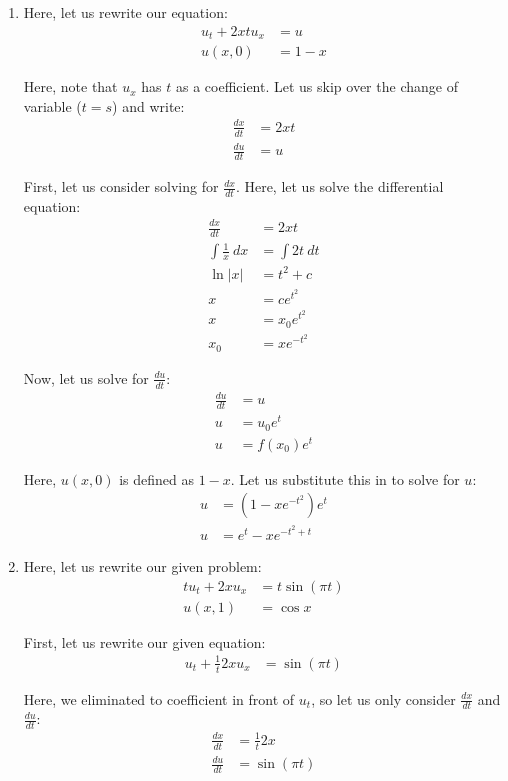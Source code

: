 \begin{enumerate}
  \item Here, let us rewrite our equation:
  \begin{align}
    u_t + 2x tu_x & = u\\
    u(x, 0) & = 1 - x
  \end{align}

  Here, note that $u_x$ has $t$ as a coefficient. Let us skip over the change of variable ($t = s$) and write:
  \begin{align}
    \frac{dx}{dt} & = 2xt\\
    \frac{du}{dt} & = u
  \end{align}

  First, let us consider solving for $\frac{dx}{dt}$.
  Here, let us solve the differential equation:
  \begin{align}
    \frac{dx}{dt} & = 2xt\\
    \int \frac{1}{x}\ dx & = \int 2t\ dt\\
    \ln |x| & = t^2 + c\\
    x & = ce^{t^2}\\
    x & = x_0 e^{t^2}\\
    x_0 & = x e^{-t^2}
  \end{align}

  Now, let us solve for $\frac{du}{dt}$:
  \begin{align}
    \frac{du}{dt} & = u\\
    u & = u_0 e^{t}\\
    u & = f(x_0) e^{t}
  \end{align}

  Here, $u(x, 0)$ is defined as $1 - x$. Let us substitute this in to solve for $u$:
  \begin{align}
    u & = \left( 1 - x e^{-t^2} \right) e^t\\
    u & = e^t - x e^{-t^2 + t}
  \end{align}

  \item Here, let us rewrite our given problem:
  \begin{align}
    tu_t + 2xu_x & = t \sin(\pi t)\\
    u(x, 1) & = \cos x
  \end{align}

  First, let us rewrite our given equation:
  \begin{align}
    u_t + \frac{1}{t} 2x u_x & = \sin(\pi t)
  \end{align}

  Here, we eliminated to coefficient in front of $u_t$, so let us only consider
  $\frac{dx}{dt}$ and $\frac{du}{dt}$:
  \begin{align}
    \frac{dx}{dt} & = \frac{1}{t} 2x\\
    \frac{du}{dt} & = \sin(\pi t)
  \end{align}


\end{enumerate}
